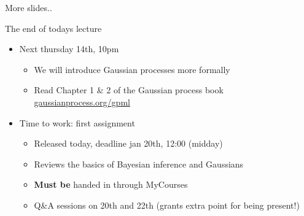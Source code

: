 \begin{frame}{More slides..}
\end{frame}


\begin{frame}{The end of todays lecture}
\begin{itemize}
	\item Next thursday 14th, 10pm 
	\begin{itemize}
		\item We will introduce Gaussian processes more formally
		\item Read Chapter 1 \& 2 of the Gaussian process book \url{gaussianprocess.org/gpml}
	\end{itemize}

	\vspace{10mm}

	\item Time to work: first assignment
	\begin{itemize}
	    \item Released today, deadline jan 20th, 12:00 (midday)
		\item Reviews the basics of Bayesian inference and Gaussians
    	\item \textbf{Must be} handed in through MyCourses
    	\item Q\&A sessions on 20th and 22th (grants extra point for being present!)
	\end{itemize}
\end{itemize}
\end{frame}



